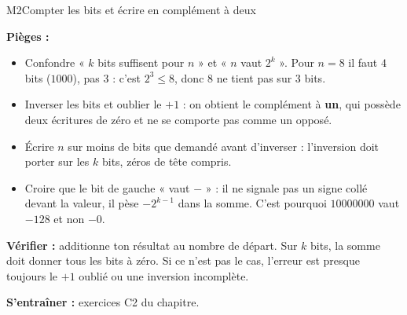 \begin{fichemethode}{M2}{Compter les bits et écrire en complément à deux}

\textbf{Pièges :}
\begin{itemize}
  \item Confondre « $k$ bits suffisent pour $n$ » et « $n$ vaut $2^{k}$ ». Pour $n = 8$ il
    faut $4$ bits ($1000$), pas $3$ : c'est $2^{3} \leqslant 8$, donc $8$ ne tient pas sur
    $3$ bits.
  \item Inverser les bits et oublier le $+1$ : on obtient le complément à \textbf{un}, qui
    possède deux écritures de zéro et ne se comporte pas comme un opposé.
  \item Écrire $n$ sur moins de bits que demandé avant d'inverser : l'inversion doit porter
    sur les $k$ bits, zéros de tête compris.
  \item Croire que le bit de gauche « vaut $-$ » : il ne signale pas un signe collé devant
    la valeur, il pèse $-2^{k-1}$ dans la somme. C'est pourquoi $10000000$ vaut $-128$ et
    non $-0$.
\end{itemize}

\textbf{Vérifier :} additionne ton résultat au nombre de départ. Sur $k$ bits, la somme doit
donner tous les bits à zéro. Si ce n'est pas le cas, l'erreur est presque toujours le $+1$
oublié ou une inversion incomplète.

\textbf{S'entraîner :} exercices C2 du chapitre.
\end{fichemethode}
